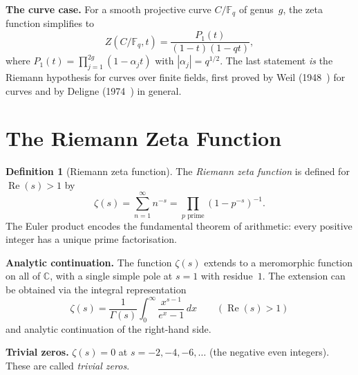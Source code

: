 \documentclass[11pt,a4paper]{article}
\theoremstyle{plain}
\theoremstyle{definition}
\newtheorem{definition}[theorem]{Definition}
\newcommand{\C}{\mathbb{C}}
\newcommand{\F}{\mathbb{F}}
\begin{document}
\begin{tcolorbox}[colback=yellow!12, colframe=yellow!12,
  boxrule=0pt, sharp corners]
\textbf{The curve case.} For a smooth projective curve $C/\F_q$ of
genus~$g$, the zeta function simplifies to
\[
  Z(C/\F_q, t) = \frac{P_1(t)}{(1-t)(1-qt)},
\]
where $P_1(t) = \prod_{j=1}^{2g}(1 - \alpha_j t)$ with
$|\alpha_j| = q^{1/2}$. The last statement \emph{is} the Riemann
hypothesis for curves over finite fields, first proved by Weil
(1948~\cite{Weil1948}) for curves and by Deligne
(1974~\cite{Deligne1974}) in general.
\end{tcolorbox}


\section{The Riemann Zeta Function}
\label{sec:riemann}

\begin{tcolorbox}[breakable, colback=green!8, colframe=green!8,
  boxrule=0pt, sharp corners]
\begin{definition}[Riemann zeta function]
\label{def:riemann-zeta}
The \emph{Riemann zeta function} is defined for $\operatorname{Re}(s) > 1$ by
\begin{equation}
\label{eq:riemann-def}
  \zeta(s) = \sum_{n=1}^{\infty} n^{-s}
  = \prod_{p \text{ prime}} \left(1 - p^{-s}\right)^{-1}.
\end{equation}
The Euler product encodes the fundamental theorem of arithmetic:
every positive integer has a unique prime factorisation.
\end{definition}
\end{tcolorbox}

\begin{tcolorbox}[breakable, colback=black!5, colframe=black!5,
  boxrule=0pt, sharp corners]
\textbf{Analytic continuation.}
The function $\zeta(s)$ extends to a meromorphic function on all of
$\C$, with a single simple pole at $s = 1$ with residue~$1$. The
extension can be obtained via the integral representation
\[
  \zeta(s) = \frac{1}{\Gamma(s)} \int_0^{\infty}
  \frac{x^{s-1}}{e^x - 1}\, dx
  \qquad (\operatorname{Re}(s) > 1)
\]
and analytic continuation of the right-hand side.

\medskip
\textbf{Trivial zeros.}
$\zeta(s) = 0$ at $s = -2, -4, -6, \ldots$ (the negative even
integers). These are called \emph{trivial zeros}.
\end{tcolorbox}
\end{document}

